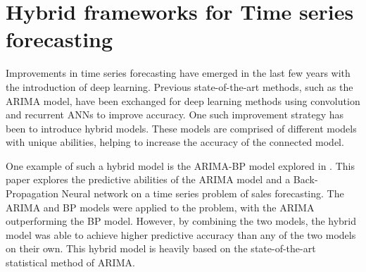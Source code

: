 \section{Hybrid frameworks for Time series forecasting}
\label{section:RelatedWork:Hybrid}

Improvements in time series forecasting have emerged in the last few years with the introduction of deep learning.
Previous state-of-the-art methods, such as the ARIMA model, have been exchanged for deep learning methods using convolution and recurrent ANNs to improve accuracy.
One such improvement strategy has been to introduce hybrid models.
These models are comprised of different models with unique abilities, helping to increase the accuracy of the connected model.


One example of such a hybrid model is the ARIMA-BP model explored in \cite{Bowen2020}.
This paper explores the predictive abilities of the ARIMA model and a Back-Propagation Neural network on a time series problem of sales forecasting.
The ARIMA and BP models were applied to the problem, with the ARIMA outperforming the BP model.
However, by combining the two models, the hybrid model was able to achieve higher predictive accuracy than any of the two models on their own.
This hybrid model is heavily based on the state-of-the-art statistical method of ARIMA.




